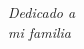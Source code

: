 \chapter*{}
\fancyfoot[R]{\thepage}
\begin{flushright}
\textit{Dedicado a \\
mi familia}
\end{flushright}